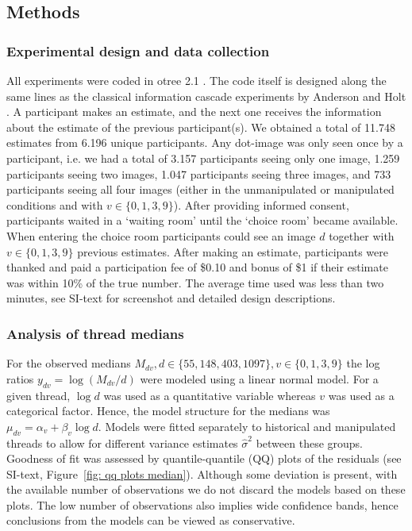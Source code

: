 \documentclass[9pt,a4paper,twocolumn,lineno]{article}
\begin{document}
\subsection*{Methods}\scriptsize
\subsubsection*{Experimental design and data collection}
All experiments were coded in otree 2.1 \cite{chen2016otree}. The code itself is designed along the same lines as the classical information cascade experiments by Anderson and Holt \cite{anderson1997information}. A participant makes an estimate, and the next one receives the information about the estimate of the previous participant(s). %
We obtained a total of 11.748 estimates from 6.196 unique participants. Any dot-image was only seen once by a participant, i.e. we had a total of 3.157 participants seeing only one image, 1.259 participants seeing two images, 1.047 participants seeing three images, and 733 participants seeing all four images (either in the unmanipulated or manipulated conditions and with $v \in \{0, 1, 3, 9\}$). After providing informed consent, participants waited in a ‘waiting room’ until the ‘choice room’ became available. When entering the choice room participants could see an image $d$ together with $v \in \{0,1,3,9\}$ previous estimates. After making an estimate, participants were thanked and paid a participation fee of \$0.10 and bonus of \$1 if their estimate was within 10\% of the true number. The average time used was less than two minutes, see SI-text for screenshot and detailed design descriptions.

\subsubsection*{Analysis of thread medians} For the observed medians $M_{dv}, d\in \{55,148,403,1097\}, v \in \{0,1,3,9\}$ the log ratios $y_{dv} = \log (M_{dv}/d)$ were modeled using a linear normal model. For a given thread, $\log{d}$ was used as a quantitative variable whereas $v$ was used as a categorical factor. Hence, the model structure for the medians was $\mu_{dv} = \alpha_v+\beta_v\log{d}$. Models were fitted separately to historical and manipulated threads to allow for different variance estimates $\hat{\sigma}^2$ between these groups. Goodness of fit was assessed by quantile-quantile (QQ) plots of the residuals (see SI-text, Figure~\ref{fig: qq plots median}). Although some deviation is present, with the available number of observations we do not discard the models based on these plots. The low number of observations also implies wide confidence bands, hence conclusions from the models can be viewed as conservative.
\end{document}
